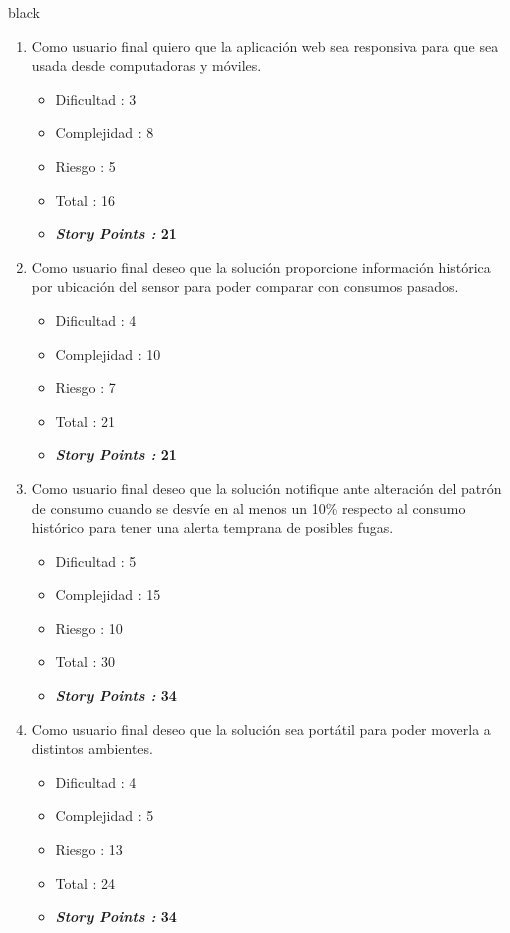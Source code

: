 \documentclass[
11pt, %
codirector, %
]{charter}
\begin{document}
\begin{consigna}{black}
\begin{enumerate}
\item Como usuario final quiero que la aplicación web sea responsiva para que sea usada desde computadoras y móviles.
	\begin{itemize}
		\item Dificultad	:  3
		\item Complejidad	:  8
		\item Riesgo		:  5
		\item Total			: 16
		\item \textbf{\textit{Story Points	:} 21}		
	\end{itemize}

\item Como usuario final deseo que la solución proporcione información histórica por ubicación del sensor para poder comparar con consumos pasados.
	\begin{itemize}
		\item Dificultad	:  4
		\item Complejidad	: 10
		\item Riesgo		:  7
		\item Total			: 21
		\item \textbf{\textit{Story Points	:} 21}		
	\end{itemize}

\item Como usuario final deseo que la solución notifique ante alteración del patrón de consumo cuando se desvíe en al menos un 10\% respecto al consumo histórico para tener una alerta temprana de posibles fugas.
	\begin{itemize}
		\item Dificultad	:  5
		\item Complejidad	: 15
		\item Riesgo		: 10
		\item Total			: 30
		\item \textbf{\textit{Story Points	:} 34}		
	\end{itemize}
	
\item Como usuario final deseo que la solución sea portátil para poder moverla a distintos ambientes.
	\begin{itemize}
		\item Dificultad	:  4
		\item Complejidad	:  5
		\item Riesgo		: 13
		\item Total			: 24
		\item \textbf{\textit{Story Points	:} 34}		
	\end{itemize}
\end{enumerate}

\end{consigna}
\end{document}
